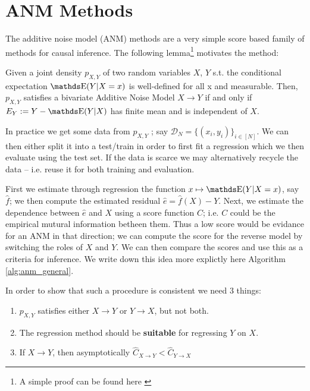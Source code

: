 \section{ANM Methods}

The additive noise model (ANM) methods are a very simple score based family of methods for causal inference.
The following lemma\footnote{A simple proof can be found here \cite{Mooij2016jmlr}} motivates the method:

\begin{lemma}
    Given a joint density $p_{X, Y}$ of two random variables $X$, $Y$ s.t. the conditional expectation
    $\E(Y |X = x)$ is well-defined for all x and measurable. Then, $p_{X, Y}$ satisfies a bivariate 
    Additive Noise Model $X \rightarrow Y$ if and only if $E_Y := Y - \E(Y|X)$ has 
    finite mean and is independent of $X$.
\end{lemma}

In practice we get some data from $p_{X, Y}$ ; say 
$\mathcal{D}_N = \{ (x_i, y_i )\}_{i \in [N]}$. We can then either split it into a test/train in order to 
first fit a regression which we then evaluate using the test set. If the data is scarce we may alternatively 
recycle the data -- i.e. reuse it for both training and evaluation.

First we estimate through regression the function $x \mapsto \E(Y | X=x)$, say $\hat{f}$; we 
then compute the estimated residual $\hat{e} = \hat{f}(X) - Y$. 
Next, we estimate the dependence between $\hat{e}$ and $X$ using a score function $C$; i.e. $C$ could be 
the empirical mutural information betheen them. Thus a low score would be evidance for an ANM in that direction; 
we can compute the score for the reverse model by switching the roles of $X$ and $Y$. We can then compare 
the scores and use this as a criteria for inference. We write down this idea more explictly 
here Algorithm \ref{alg:anm_general}.

In order to show that such a procedure is consistent we need 3 things:

\begin{enumerate}
    \item $p_{X, Y}$ satisfies either $X \rightarrow Y$ or $Y \rightarrow X$, but not both.
    \item The regression method should be \textbf{suitable} for regressing $Y$ on $X$.
    \item If $X \rightarrow Y$, then asymptotically $\hat{C}_{X \rightarrow Y} < \hat{C}_{Y \rightarrow X}$
\end{enumerate}


